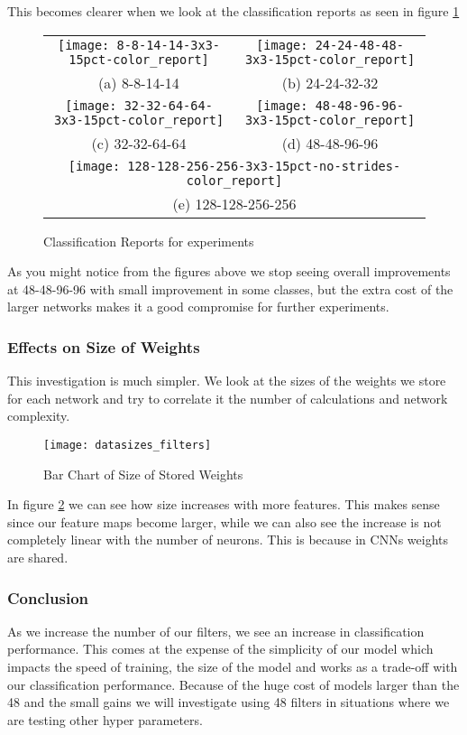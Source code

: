 This becomes clearer when we look at the classification reports as seen in figure \ref{repnf}
\begin{figure}[h!]
	\begin{tabular}{cc}
		\texttt{[image: 8-8-14-14-3x3-15pct-color\_report]} &   \texttt{[image: 24-24-48-48-3x3-15pct-color\_report]} \\
		(a) 8-8-14-14 & (b) 24-24-32-32 \\[6pt]
		\texttt{[image: 32-32-64-64-3x3-15pct-color\_report]} &   \texttt{[image: 48-48-96-96-3x3-15pct-color\_report]} \\
		(c) 32-32-64-64 & (d) 48-48-96-96 \\[6pt]
		\multicolumn{2}{c}{\texttt{[image: 128-128-256-256-3x3-15pct-no-strides-color\_report]} }\\
		\multicolumn{2}{c}{(e) 128-128-256-256}
	\end{tabular}
\caption{Classification Reports for experiments}
\label{repnf}
\end{figure}

As you might notice from the figures above we stop seeing overall improvements at 48-48-96-96 with small improvement in some classes, but the extra cost of the larger networks makes it a good compromise for further experiments.

\subsubsection{Effects on Size of Weights}
This investigation is much simpler. We look at the sizes of the weights we store for each network and try to correlate it the number of calculations and network complexity.

\begin{figure}[h!]
	\texttt{[image: datasizes\_filters]}
	\caption{Bar Chart of Size of Stored Weights}
	\label{sownf}
\end{figure}

In figure \ref{sownf} we can see how size increases with  more features. This makes sense since our feature maps become larger, while we can also see the increase is not completely linear with the number of neurons. This is because in CNNs weights are shared.

\subsubsection{Conclusion}
As we increase the number of our filters, we see an increase in classification performance. This comes at the expense of the simplicity of our model which impacts the speed of training, the size of the model and works as a trade-off with our classification performance.  Because of the huge cost of models larger than the 48 and the small gains we will investigate using 48 filters in situations where we are testing other hyper parameters.

